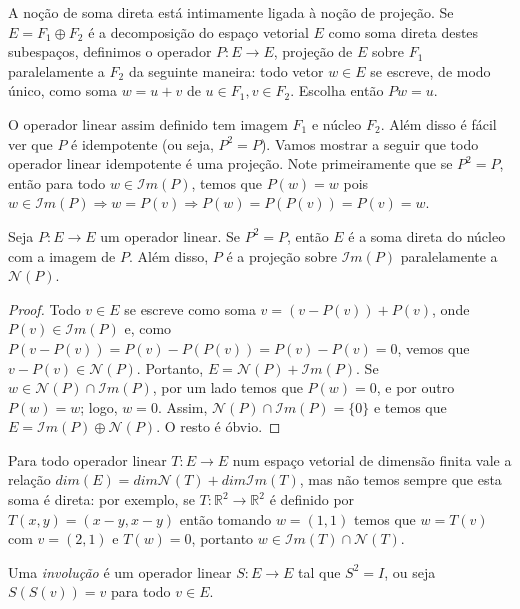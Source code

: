 A noção de soma direta está intimamente ligada à noção de projeção. Se $E=F_1\oplus F_2$ é a decomposição do espaço vetorial $E$ como soma direta destes subespaços, definimos o operador $P:E\rightarrow E$, projeção de $E$ sobre $F_1$ paralelamente a $F_2$ da seguinte maneira: todo vetor $w\in E$ se escreve, de modo único, como soma $w=u+v$ de $u\in F_1,v\in F_2$. Escolha então $Pw=u$. %

O operador linear assim definido tem imagem $F_1$ e núcleo $F_2$. Além disso é fácil ver que $P$ é idempotente (ou seja, $P^2=P$). Vamos mostrar a seguir que todo operador linear idempotente é uma projeção. Note primeiramente que se $P^2=P$, então para todo $w\in {\mathcal{I}}m(P)$, temos que $P(w)=w$ pois $w\in {\mathcal{I}}m(P) \Rightarrow w=P(v) \Rightarrow P(w)=P(P(v))=P(v)=w$.

\begin{teo}
  Seja $P:E\rightarrow E$ um operador linear. Se $P^2=P$, então $E$ é a soma direta do núcleo com a imagem de $P$. Além disso, $P$ é a projeção sobre ${\mathcal{I}}m(P)$ paralelamente a ${\mathcal{N}}(P)$.
\end{teo}

\begin{proof}
Todo $v\in E$ se escreve como soma $v=(v-P(v))+P(v)$, onde $P(v) \in {\mathcal{I}}m(P)$ e, como $P(v-P(v))=P(v)-P(P(v))=P(v)-P(v)=0$, vemos que $v-P(v) \in {\mathcal{N}}(P)$. Portanto, $E={\mathcal{N}}(P)+{\mathcal{I}}m(P)$. Se $w\in {\mathcal{N}}(P)\cap {\mathcal{I}}m(P)$, por um lado temos que $P(w)=0$, e por outro $P(w)=w$; logo, $w=0$. Assim, ${\mathcal{N}}(P)\cap {\mathcal{I}}m(P)=\{0\}$ e temos que $E={\mathcal{I}}m(P) \oplus {\mathcal{N}}(P)$. O resto é óbvio.
\end{proof}

\begin{exemplo}
  Para todo operador linear $T:E\rightarrow E$ num espaço vetorial de dimensão finita vale a relação $dim(E)=dim{\mathcal{N}}(T)+dim{\mathcal{I}}m(T)$, mas não temos sempre que esta soma é direta: por exemplo, se $T:{\mathbb{R}}^2 \rightarrow {\mathbb{R}}^2$ é definido por $T(x,y)=(x-y,x-y)$ então tomando $w=(1,1)$ temos que $w=T(v)$ com $v=(2,1)$ e $T(w)=0$, portanto $w\in {\mathcal{I}}m(T)\cap {\mathcal{N}}(T)$.
\end{exemplo}

\begin{defi}
  Uma \emph{involução} é um operador linear $S:E\rightarrow E$ tal que $S^2=I$, ou seja $S(S(v))=v$ para todo $v\in E$.
\end{defi}

